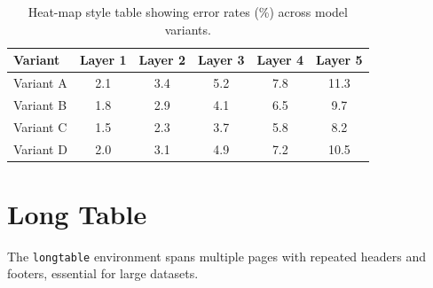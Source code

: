\documentclass[
    language=english,
    doctype=article,
    institution=none,
]{../../omnilatex}
\begin{document}
\begin{table}[htbp]
    \centering
    \caption{Heat-map style table showing error rates (\%) across model variants.}
    \label{tab:colored}
    \begin{tabular}{l *{5}{c}}
        \toprule
        \rowcolor{headerblue!15}
        \textbf{Variant} & \textbf{Layer 1} & \textbf{Layer 2} & \textbf{Layer 3} & \textbf{Layer 4} & \textbf{Layer 5} \\
        \midrule
        Variant A  & \cellcolor{accentgreen!20}2.1 & \cellcolor{accentgreen!15}3.4 & \cellcolor{cellmid!50}5.2 & \cellcolor{accentorange!30}7.8 & \cellcolor{accentred!30}11.3 \\
        Variant B  & \cellcolor{accentgreen!25}1.8 & \cellcolor{accentgreen!20}2.9 & \cellcolor{accentgreen!15}4.1 & \cellcolor{cellmid!50}6.5 & \cellcolor{accentorange!30}9.7 \\
        Variant C  & \cellcolor{accentgreen!30}1.5 & \cellcolor{accentgreen!25}2.3 & \cellcolor{accentgreen!20}3.7 & \cellcolor{accentgreen!15}5.8 & \cellcolor{cellmid!50}8.2 \\
        Variant D  & \cellcolor{accentgreen!20}2.0 & \cellcolor{accentgreen!15}3.1 & \cellcolor{cellmid!50}4.9 & \cellcolor{accentorange!30}7.2 & \cellcolor{accentred!30}10.5 \\
        \bottomrule
    \end{tabular}
\end{table}

\section{Long Table}
\label{sec:long-table}

The \texttt{longtable} environment spans multiple pages with repeated headers
and footers, essential for large datasets.
\end{document}

